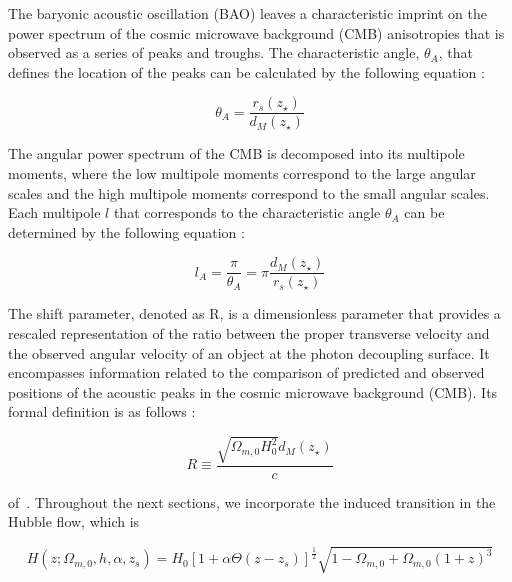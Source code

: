 \documentclass[universe,article,accept,moreauthors,pdftex]{Definitions/mdpi}
\begin{document}
The baryonic acoustic oscillation (BAO) leaves a characteristic imprint on the power spectrum of the cosmic microwave background (CMB) anisotropies that is observed as a series of peaks and troughs. The characteristic angle, $\theta_{A}$, that defines the location of the peaks can be calculated by the following equation \cite{amendola_tsujikawa_2010}:

\begin{equation}
\theta_{A}=\frac{r_{s}(z_{\star})}{d_{M}(z_{\star})}
\end{equation}

 The angular power spectrum of the CMB is decomposed into its multipole moments, where the low multipole moments correspond to the large angular scales and the high multipole moments correspond to the small angular scales. Each multipole $l$ that corresponds to the characteristic angle $\theta_{A}$ can be determined by the following equation \cite{amendola_tsujikawa_2010}:

\begin{equation}
l_{A}=\frac{\pi}{\theta_{A}}=\pi \frac{d_{M}(z_{\star})}{r_{s}(z_{\star})}
\end{equation}

The shift parameter, denoted as R, is a dimensionless parameter that provides a rescaled representation of the ratio between the proper transverse velocity and the observed angular velocity of an object at the photon decoupling surface. It encompasses information related to the comparison of predicted and observed positions of the acoustic peaks in the cosmic microwave background (CMB). Its formal definition is as follows \cite{amendola_tsujikawa_2010}:

\begin{equation}
R\equiv\frac{\sqrt{\Omega_{m,0}H_{0}^{2}}d_{M}(z_{\star})}{c}
\end{equation}

 \mbox{of \cite{Theodoropoulos:2021hkk,Zhai:2018vmm,Kazantzidis_2019}}. Throughout the next sections, we incorporate the induced transition in the Hubble flow, which is

\begin{equation}
    H(z;\Omega_{m,0},h,\alpha,z_{s})=H_{0}[1+\alpha \Theta(z-z_{s})]^{\frac{1}{2}}\sqrt{1-\Omega_{m,0}+\Omega_{m,0}(1+z)^{3}}
\end{equation}
\end{document}
